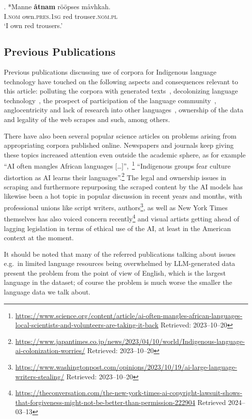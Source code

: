 \documentclass[free]{flammie}
\begin{document}
 \exg. *Manne \textbf{åtnam} rööpses måvhkah.\label{maavkaherr}\\
 I\textsc{.nom} own\textsc{.pres.1sg} red trouser\textsc{.nom.pl}\\
`I own red trousers.'

\subsection{Previous Publications}

Previous publications discussing use of corpora for Indigenous language
technology have touched on the following aspects and consequences relevant to
this article: polluting the corpora with generated
texts~\cite{shumailov2023model}, decolonizing language
technology~\cite{bird2020decolonising}, the prospect of participation of the
language community~\cite{birhane2022power}, anglocentricity and lack of research
into other languages~\cite{joshi-etal-2020-state}, ownership of the data and
legality of the web scrapes and such, among others.

There have also been several popular science articles on problems arising from
appropriating corpora published online. Newspapers and journals keep giving
these topics increased attention even outside the academic sphere, as for
example ``AI often mangles African languages [\ldots]'',~\footnote{\url{https://www.science.org/content/article/ai-often-mangles-african-languages-local-scientists-and-volunteers-are-taking-it-back}
\smaller{}Retrieved: 2023--10--20} ``Indigenous groups fear culture distortion as
AI learns their
languages''.\footnote{\url{https://www.japantimes.co.jp/news/2023/04/10/world/Indigenous-language-ai-colonization-worries/}
\smaller{}Retrieved: 2023--10--20} The legal and ownership issues in scraping and
furthermore repurposing the scraped content by the AI models has likewise been a
hot topic in popular discussion in recent years and months, with professional
unions like script writers,
authors\footnote{\url{https://www.washingtonpost.com/opinions/2023/10/19/ai-large-language-writers-stealing/}
\smaller{} Retrieved: 2023--10--20}, as well as New York Times themselves has also
voiced concern
recently\footnote{\url{https://theconversation.com/the-new-york-times-ai-copyright-lawsuit-shows-that-forgiveness-might-not-be-better-than-permission-222904}
\smaller{} Retrieved 2024--03--13} and visual artists getting ahead of lagging
legislation in terms of ethical use of the AI, at least in the American context
at the moment.

It should be noted that many of the referred publications talking about issues
e.g.\ in limited language resources being overwhelmed by LLM-generated
data~\cite{shumailov2023model} present the problem from the point of view of
English, which is the largest language in the dataset; of course the problem is
much worse the smaller the language data we talk about.
\end{document}
